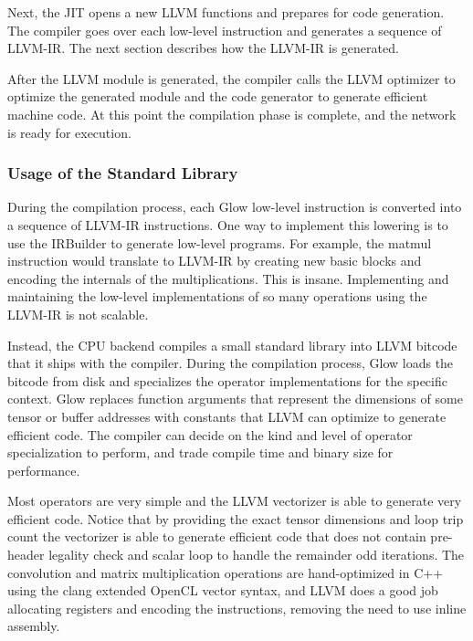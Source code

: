 Next, the J\+IT opens a new L\+L\+VM functions and prepares for code generation. The compiler goes over each low-\/level instruction and generates a sequence of L\+L\+V\+M-\/\+IR. The next section describes how the L\+L\+V\+M-\/\+IR is generated.

After the L\+L\+VM module is generated, the compiler calls the L\+L\+VM optimizer to optimize the generated module and the code generator to generate efficient machine code. At this point the compilation phase is complete, and the network is ready for execution.

\subsubsection*{Usage of the Standard Library}

During the compilation process, each Glow low-\/level instruction is converted into a sequence of L\+L\+V\+M-\/\+IR instructions. One way to implement this lowering is to use the I\+R\+Builder to generate low-\/level programs. For example, the matmul instruction would translate to L\+L\+V\+M-\/\+IR by creating new basic blocks and encoding the internals of the multiplications. This is insane. Implementing and maintaining the low-\/level implementations of so many operations using the L\+L\+V\+M-\/\+IR is not scalable.

Instead, the C\+PU backend compiles a small standard library into L\+L\+VM bitcode that it ships with the compiler. During the compilation process, Glow loads the bitcode from disk and specializes the operator implementations for the specific context. Glow replaces function arguments that represent the dimensions of some tensor or buffer addresses with constants that L\+L\+VM can optimize to generate efficient code. The compiler can decide on the kind and level of operator specialization to perform, and trade compile time and binary size for performance.

Most operators are very simple and the L\+L\+VM vectorizer is able to generate very efficient code. Notice that by providing the exact tensor dimensions and loop trip count the vectorizer is able to generate efficient code that does not contain pre-\/header legality check and scalar loop to handle the remainder odd iterations. The convolution and matrix multiplication operations are hand-\/optimized in C++ using the clang extended Open\+CL vector syntax, and L\+L\+VM does a good job allocating registers and encoding the instructions, removing the need to use inline assembly.


